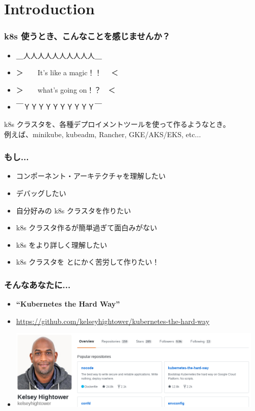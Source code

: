 \documentclass[aspectratio=169,11pt,hyperref={colorlinks=true}]{beamer}
\begin{document}
\section{Introduction}
\begin{frame}
  \frametitle{k8s 使うとき、こんなことを感じませんか？}
  \begin{itemize}
    \item[] \Huge{＿人人人人人人人人人人＿}
    \item[] \Huge{＞　　It's like a magic！！ 　＜}
    \item[] \Huge{＞　　what's going on！？　＜}
    \item[] \Huge{￣ＹＹＹＹＹＹＹＹＹＹ￣}
  \end{itemize}
  k8s クラスタを、各種デプロイメントツールを使って作るようなとき。\\
  例えば、minikube, kubeadm, Rancher, GKE/AKS/EKS, etc...
\end{frame}

\begin{frame}
  \frametitle{もし...}
  \begin{itemize}
    \item コンポーネント・アーキテクチャを理解したい
    \item デバッグしたい
    \item 自分好みの k8s クラスタを作りたい
    \item k8s クラスタ作るが簡単過ぎて面白みがない
    \item k8s をより詳しく理解したい
    \item k8s クラスタを とにかく苦労して作りたい！
  \end{itemize}
\end{frame}

\begin{frame}
  \frametitle{そんなあなたに...}
  \begin{itemize}
    \item[] \Huge{\bf ``Kubernetes the Hard Way''}\large{}
    \item \url{https://github.com/kelseyhightower/kubernetes-the-hard-way}
    \item[] \includegraphics[height=38mm]{images/kelseyhightower_overview.png}
  \end{itemize}
\end{frame}
\end{document}

